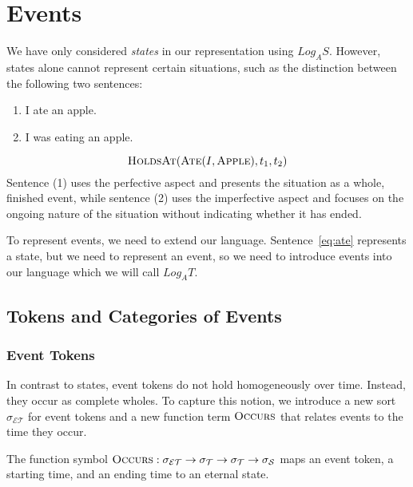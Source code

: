 \chapter{Events}

We have only considered \textit{states} in our representation using $Log_A S$. However, states alone cannot represent certain situations, such as the distinction between the following two sentences:

\begin{enumerate}[label=(\arabic*)]
    \item I ate an apple.
    \item I was eating an apple.
\end{enumerate}

\begin{equation}
    \textsc{HoldsAt}(\textsc{Ate}(I, \textsc{Apple}), t_1, t_2)
    \label{eq:ate}
\end{equation}
Sentence (1) uses the perfective aspect and presents the situation as a whole, finished event, while sentence (2) uses the imperfective aspect and focuses on the ongoing nature of the situation without indicating whether it has ended.

To represent events, we need to extend our language. Sentence~\ref{eq:ate} represents a state, but we need to represent an event, so we need to introduce events into our language
which we will call $Log_A T$.

\section{Tokens and Categories of Events}
\subsection{Event Tokens}

In contrast to states, event tokens do not hold homogeneously over time.
Instead, they occur as complete wholes.
To capture this notion, we introduce a new sort $\sigma_\mathcal{ET}$ for event tokens and a new function term $\textsc{Occurs}$ that relates events to the time they occur.

The function symbol $\textsc{Occurs}: \sigma_\mathcal{ET} \to \sigma_\mathcal{T} \to \sigma_\mathcal{T} \to \sigma_\mathcal{S}$ maps an event token,
a starting time, and an ending time to an eternal state.

